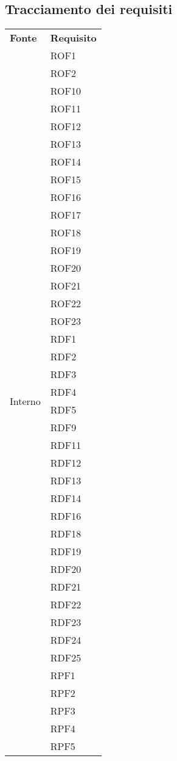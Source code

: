 \subsection{Tracciamento dei requisiti}
\begin{longtable}{| p{5cm} | p{5cm} |}
		\rowcolor{LightBlue}
		\color{white}\bfseries Fonte & \color{white}\bfseries Requisito \\[0.25cm]
\multirow[t]{61}{*}{Interno}		
				 & 	ROF1 \\
				&	ROF2 \\
				&	ROF10 \\
				&	ROF11 \\
				&	ROF12 \\
				&	ROF13 \\
				&	ROF14 \\
				&	ROF15 \\
				&	ROF16 \\
				&	ROF17 \\
				&	ROF18 \\
				&	ROF19 \\
				&	ROF20 \\
				&	ROF21 \\
				&	ROF22 \\
				& 	ROF23 \\
				&	RDF1 \\
				&	RDF2 \\
				&	RDF3 \\
				&	RDF4 \\
				&	RDF5 \\
				&	RDF9 \\
				&	RDF11 \\
				&	RDF12 \\
				&	RDF13 \\
				&	RDF14 \\
				&	RDF16 \\
				&	RDF18 \\
				&	RDF19 \\
				&	RDF20 \\
				&	RDF21 \\
				&	RDF22 \\
				&	RDF23 \\
				&	RDF24 \\
				&	RDF25 \\
				&	RPF1 \\
				&	RPF2 \\
				&	RPF3 \\
				&	RPF4 \\
				&	RPF5 \\

\end{longtable}
